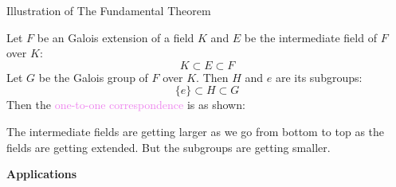 \documentclass{beamer}
\begin{document}
\begin{frame}{Illustration of The Fundamental Theorem}
  \begin{minipage}{0.65\textwidth}
  Let \(F\) be an Galois extension of a field \(K\) and \(E\) be the intermediate field of \(F\) over \(K\):
  \[
    K \subset E \subset F
  \]
\noindent
  Let \(G\) be the Galois group of \(F\) over \(K\). Then \(H\) and \({e}\) are its subgroups:
  \[
    \{e\} \subset H \subset G
  \]
  Then the \textcolor{violet}{one-to-one correspondence} is as shown:
\end{minipage}
\begin{minipage}{0.3\textwidth}

  \begin{tcolorbox}[colback=white, colback=orange!20, colframe=orange!80!black, title={\footnotesize \textcolor{white}{Galois-correspondence}}, width=4cm]
  \end{tcolorbox}
\end{minipage}

\vspace{5mm}

 \begin{tcolorbox}[colback=white, colframe=blue!40, boxsep=0mm]
\begin{definition}[Remark]
  The intermediate fields are getting larger as we go from bottom to top  as the fields are getting extended. But the subgroups are getting smaller.
\end{definition}
\end{tcolorbox}
\end{frame}

\begin{frame}[plain]
  \LARGE \centering \bfseries
  Applications
  \end{frame}
\end{document}
